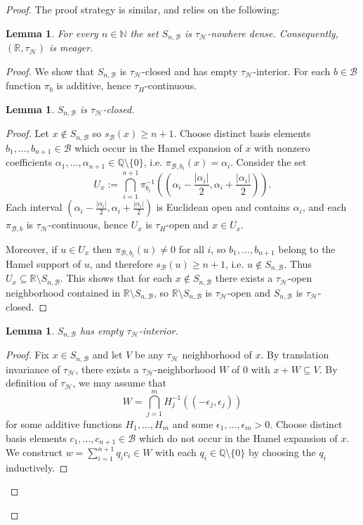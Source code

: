 \documentclass[11pt]{amsart} %
\newtheorem{lemma}[theorem]{Lemma}
\theoremstyle{definition}
\newcommand{\B}{\mathcal{B}}
\newcommand{\AD}{\mathcal{H}}
\begin{document}
\begin{proof}
The proof strategy is similar, and relies on the following:

\begin{lemma}
\label{lem:7.4}
For every $n\in\mathbb{N}$ the set $S_{n,\B}$ is $\tau_{\AD}$-nowhere dense. Consequently, $(\mathbb{R},\tau_{\AD})$ is meager.
\end{lemma}

\begin{proof}
We show that $S_{n,\B}$ is $\tau_{\AD}$-closed and has empty $\tau_{\AD}$-interior. For each $b\in\mathcal{B}$ function $\pi_{b}$ is additive, hence $\tau_{H}$-continuous.
\begin{lemma} 
$S_{n,\B}$ is $\tau_{\AD}$-closed. 
\end{lemma} 
\begin{proof} 
Let $x\notin S_{n,\B}$ so $s_\B(x)\ge n+1$. Choose distinct basis elements $b_{1},...,b_{n+1}\in\mathcal{B}$ which occur in the Hamel expansion of $x$ with nonzero coefficients $\alpha_{1},...,\alpha_{n+1}\in\mathbb{Q}\setminus\{0\}$, i.e. $\pi_{\B,b_{i}}(x)=\alpha_{i}$. Consider the set
\begin{equation} 
U_{x}:=\bigcap_{i=1}^{n+1}\pi_{b_{i}}^{-1}\left(\left(\alpha_{i}-\frac{|\alpha_{i}|}{2},\alpha_{i}+\frac{|\alpha_{i}|}{2}\right)\right). \end{equation}
Each interval $(\alpha_{i}-\frac{|\alpha_{i}|}{2},\alpha_{i}+\frac{|\alpha_{i}|}{2})$ is Euclidean open and contains $\alpha_{i}$, and each $\pi_{\B,b}$ is $\tau_{\AD}$-continuous, hence $U_{x}$ is $\tau_{H}$-open and $x\in U_{x}$.

Moreover, if $u\in U_{x}$ then $\pi_{\B,b_{i}}(u)\ne0$ for all $i$, so $b_{1},...,b_{n+1}$ belong to the Hamel support of $u$, and therefore $s_\B(u)\ge n+1$, i.e. $u\notin S_{n,\B}$. Thus $U_{x}\subseteq\mathbb{R}\setminus S_{n,\B}$. This shows that for each $x\notin S_{n,\B}$ there exists a $\tau_{\AD}$-open neighborhood contained in $\mathbb{R}\setminus S_{n,\B}$, so $\mathbb{R}\setminus S_{n,\B}$ is $\tau_{\AD}$-open and $S_{n,\B}$ is $\tau_{\AD}$-closed.
\end{proof} 
\begin{lemma} 
$S_{n,\B}$ has empty $\tau_{\AD}$-interior.
\end{lemma}  
\begin{proof} 
Fix $x\in S_{n,\B}$ and let $V$ be any $\tau_{\AD}$ neighborhood of $x$. By translation invariance of $\tau_{\AD}$, there exists a $\tau_{\AD}$-neighborhood $W$ of $0$ with $x+W\subseteq V$. By definition of $\tau_{\AD}$, we may assume that 
\begin{equation}  W=\bigcap_{j=1}^{m}H_{j}^{-1}((-\epsilon_{j},\epsilon_{j})) \end{equation} 
for some additive functions $H_{1},...,H_{m}$ and some $\epsilon_{1},...,\epsilon_{m}>0$. Choose distinct basis elements $c_{1},...,c_{n+1}\in\mathcal{B}$ which do not occur in the Hamel expansion of $x$. We construct $w=\sum_{i=1}^{n+1}q_{i}c_{i}\in W$ with each $q_{i}\in\mathbb{Q}\setminus\{0\}$ by choosing the $q_{i}$ inductively.


\end{proof}
\end{proof}
\end{proof}
\end{document}

